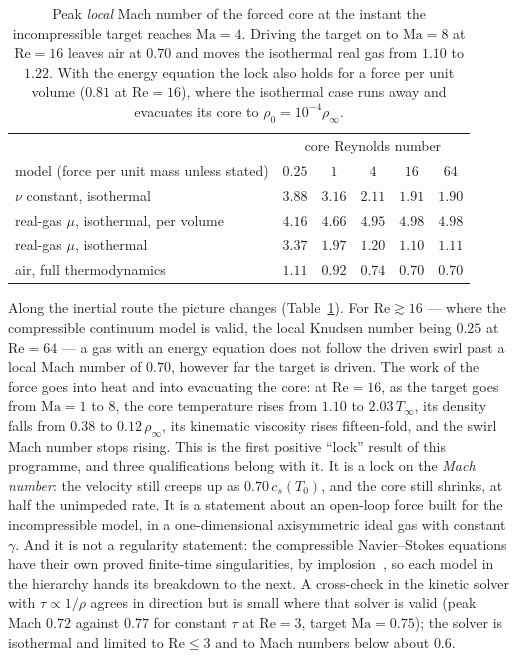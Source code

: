 \documentclass[11pt,a4paper]{article}
\begin{document}
\begin{table}[h]
\centering
\small
\begin{tabular}{lccccc}
\toprule
 & \multicolumn{5}{c}{core Reynolds number} \\
model (force per unit mass unless stated) & $0.25$ & $1$ & $4$ & $16$ & $64$ \\
\midrule
$\nu$ constant, isothermal            & $3.88$ & $3.16$ & $2.11$ & $1.91$ & $1.90$ \\
real-gas $\mu$, isothermal, per volume & $4.16$ & $4.66$ & $4.95$ & $4.98$ & $4.98$ \\
real-gas $\mu$, isothermal            & $3.37$ & $1.97$ & $1.20$ & $1.10$ & $1.11$ \\
air, full thermodynamics              & $1.11$ & $0.92$ & $0.74$ & $\mathbf{0.70}$ & $\mathbf{0.70}$ \\
\bottomrule
\end{tabular}
\caption{Peak \emph{local} Mach number of the forced core at the instant the incompressible target
reaches $\mathrm{Ma}=4$. Driving the target on to $\mathrm{Ma}=8$ at $\mathrm{Re}=16$ leaves air at
$0.70$ and moves the isothermal real gas from $1.10$ to $1.22$. With the energy equation the lock also
holds for a force per unit volume ($0.81$ at $\mathrm{Re}=16$), where the isothermal case runs away and
evacuates its core to $\rho_0=10^{-4}\rho_\infty$.}
\label{tab:mach-lock}
\end{table}

Along the inertial route the picture changes (Table~\ref{tab:mach-lock}). For
$\mathrm{Re}\gtrsim16$ --- where the compressible continuum model is valid, the local Knudsen number
being $0.25$ at $\mathrm{Re}=64$ --- a gas with an energy equation does not follow the driven swirl
past a local Mach number of $0.70$, however far the target is driven. The work of the force goes into
heat and into evacuating the core: at $\mathrm{Re}=16$, as the target goes from $\mathrm{Ma}=1$ to $8$,
the core temperature rises from $1.10$ to $2.03\,T_\infty$, its density falls from $0.38$ to
$0.12\,\rho_\infty$, its kinematic viscosity rises fifteen-fold, and the swirl Mach number stops
rising. This is the first positive ``lock'' result of this programme, and three qualifications
belong with it. It is a lock on the \emph{Mach number}: the velocity still creeps up as
$0.70\,c_s(T_0)$, and the core still shrinks, at half the unimpeded rate. It is a statement about an
open-loop force built for the incompressible model, in a one-dimensional axisymmetric ideal gas with
constant $\gamma$. And it is not a regularity statement: the compressible Navier--Stokes equations
have their own proved finite-time singularities, by implosion~\cite{MRRS2022,BCG2025}, so each model in
the hierarchy hands its breakdown to the next. A cross-check in the kinetic solver with
$\tau\propto1/\rho$ agrees in direction but is small where that solver is valid (peak Mach $0.72$
against $0.77$ for constant $\tau$ at $\mathrm{Re}=3$, target $\mathrm{Ma}=0.75$); the solver is
isothermal and limited to $\mathrm{Re}\le3$ and to Mach numbers below about $0.6$.
\end{document}
